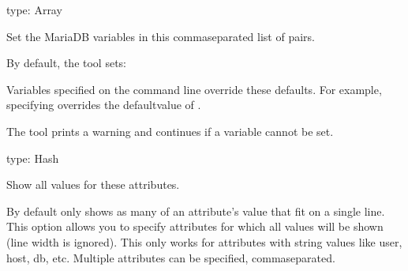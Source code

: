 \documentclass[letterpaper,10pt,english]{sphinxmanual}
\begin{document}
\begin{fulllineitems}
\label{\detokenize{mariadb-query-digest:cmdoption-mariadb-query-digest-set-vars}}
type: Array

Set the MariaDB variables in this comma\sphinxhyphen{}separated list of  pairs.

By default, the tool sets:

\begin{sphinxVerbatim}[commandchars=\\\{\}]
\end{sphinxVerbatim}

Variables specified on the command line override these defaults.  For
example, specifying  overrides the defaultvalue of .

The tool prints a warning and continues if a variable cannot be set.

\end{fulllineitems}


\begin{fulllineitems}
\label{\detokenize{mariadb-query-digest:cmdoption-mariadb-query-digest-show-all}}
type: Hash

Show all values for these attributes.

By default  only shows as many of an attribute’s value that
fit on a single line.  This option allows you to specify attributes for which
all values will be shown (line width is ignored).  This only works for
attributes with string values like user, host, db, etc.  Multiple attributes
can be specified, comma\sphinxhyphen{}separated.

\end{fulllineitems}
\end{document}
